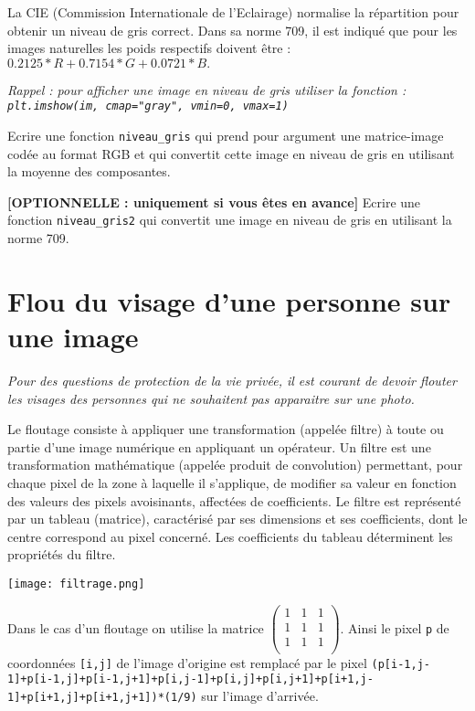 La CIE (Commission Internationale de l’Eclairage) normalise la répartition pour obtenir un niveau de gris correct. Dans sa norme 709, il est indiqué que pour les images naturelles les poids respectifs doivent être : $0.2125 * R + 0.7154 * G + 0.0721 * B.$

\textit{Rappel : pour afficher une image en niveau de gris utiliser la fonction : \texttt{plt.imshow(im, cmap="gray", vmin=0, vmax=1)}}

\begin{question}
Ecrire une fonction \texttt{niveau\_gris} qui prend pour argument une matrice-image codée au format RGB et qui convertit cette image en niveau de gris en utilisant la moyenne des composantes.
\end{question}

\begin{question} \textbf{[OPTIONNELLE : uniquement si vous êtes en avance]}
Ecrire une fonction \texttt{niveau\_gris2} qui convertit une image en niveau de gris en utilisant la norme 709.
\end{question}





\section*{Flou du visage d'une personne sur une image}


\textit{Pour des questions de protection de la vie privée, il est courant de devoir flouter les visages des personnes qui ne souhaitent pas apparaitre sur une photo. }

Le floutage consiste à appliquer une transformation (appelée filtre) à toute ou partie d’une image numérique en  appliquant un opérateur.  Un filtre est une transformation mathématique (appelée produit de convolution) permettant, pour chaque pixel  de la zone à laquelle il s’applique, de modifier sa valeur en fonction des valeurs des pixels avoisinants, affectées de coefficients. 
 Le filtre est représenté par un tableau (matrice), caractérisé par ses dimensions et ses coefficients, dont le centre
 correspond au pixel concerné. Les coefficients du tableau déterminent les propriétés du filtre.

\begin{marginfigure}%
\texttt{[image: filtrage.png]}
\end{marginfigure}

Dans le cas d'un floutage on utilise la matrice $\begin{pmatrix}  1 &  1 & 1 \\1 &  1 & 1 \\1 &  1 & 1 \\\end{pmatrix}$. 
Ainsi le pixel \texttt{p} de coordonnées \texttt{[i,j]} de l'image d'origine est remplacé par le pixel \lstinline{(p[i-1,j-1]+p[i-1,j]+p[i-1,j+1]+p[i,j-1]+p[i,j]+p[i,j+1]+p[i+1,j-1]+p[i+1,j]+p[i+1,j+1])*(1/9)} sur l'image d'arrivée.


